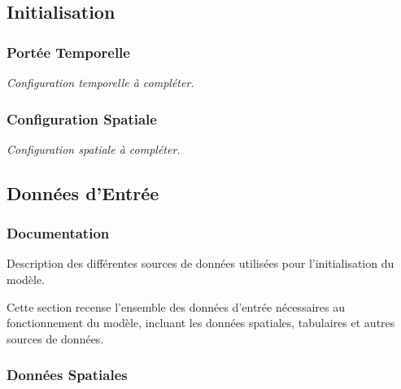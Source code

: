 \documentclass[
]{article}
\begin{document}
\subsection{Initialisation}\label{initialisation-1}

\subsubsection{Portée Temporelle}\label{portuxe9e-temporelle}

\emph{Configuration temporelle à compléter.}

\subsubsection{Configuration Spatiale}\label{configuration-spatiale}

\emph{Configuration spatiale à compléter.}

\subsection{Données d'Entrée}\label{donnuxe9es-dentruxe9e}

\subsubsection{Documentation}\label{documentation-18}

Description des différentes sources de données utilisées pour
l'initialisation du modèle.

Cette section recense l'ensemble des données d'entrée nécessaires au
fonctionnement du modèle, incluant les données spatiales, tabulaires et
autres sources de données.

\subsubsection{Données Spatiales}\label{donnuxe9es-spatiales}
\end{document}
